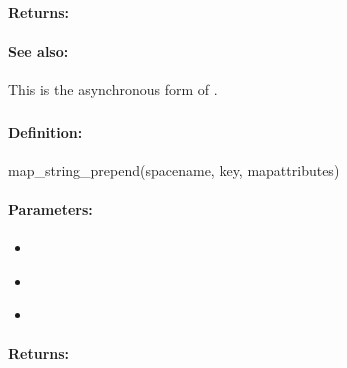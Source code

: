 \paragraph{Returns:}


\paragraph{See also:}  This is the asynchronous form of .

\pagebreak
\subsubsection{}
\label{api:ruby:map_string_prepend}


\paragraph{Definition:}
\begin{rubycode}
map_string_prepend(spacename, key, mapattributes)
\end{rubycode}

\paragraph{Parameters:}
\begin{itemize}[noitemsep]
\item {}\\

\item {}\\

\item {}\\

\end{itemize}

\paragraph{Returns:}


\pagebreak
\subsubsection{}
\label{api:ruby:async_map_string_prepend}


